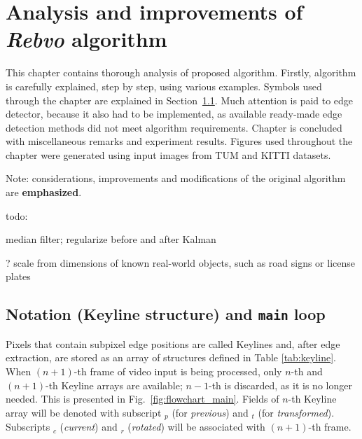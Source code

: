 \chapter{Analysis and improvements of \textit{Rebvo} algorithm}
\label{cha:intro2}

This chapter contains thorough analysis of proposed algorithm. Firstly, algorithm is carefully explained, step by step, using various examples. Symbols used through the chapter are explained in Section~\ref{sec:struct}. Much attention is paid to edge detector, because it also had to be implemented, as available ready-made edge detection methods did not meet algorithm requirements. Chapter is concluded with miscellaneous remarks and experiment results. Figures used throughout the chapter were generated using input images from TUM \cite{tum} and KITTI \cite{kitti} datasets.

Note: considerations, improvements and modifications of the original algorithm are \textbf{emphasized}.

todo: 

median filter; regularize before and after Kalman


? scale from dimensions of known real-world objects, such as road signs or license plates



\section{Notation (Keyline structure) and {\tt main} loop}
\label{sec:struct}

Pixels that contain subpixel edge positions are called Keylines and, after edge extraction, are stored as an array of structures defined in Table \ref{tab:keyline}. When $(n+1)$-th frame of video input is being processed, only $n$-th and $(n+1)$-th Keyline arrays are available; $n-1$-th is discarded, as it is no longer needed. This is presented in Fig.~\ref{fig:flowchart_main}. Fields of $n$-th Keyline array will be denoted with subscript $_{p}$ (for \textit{previous}) and $_{t}$ (for \textit{transformed}). Subscripts $_{c}$ (\textit{current}) and $_{r}$ (\textit{rotated}) will be associated with $(n+1)$-th frame.

